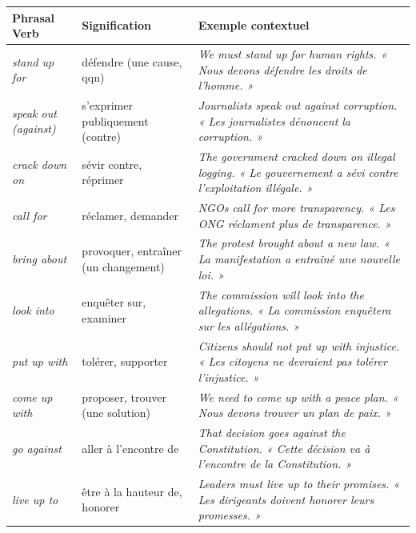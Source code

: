 \documentclass[11pt]{article}
\newcommand{\eng}[1]{\ifmmode\text{\textit{#1}}\else\begingroup\selectlanguage{english}\itshape #1\endgroup\fi}
\begin{document}
\begin{aretenir}
\begin{center}
\begin{tabularx}{\linewidth}{|X|X|X|}
\hline
\rowcolor{popblueL}
\textbf{Phrasal Verb} & \textbf{Signification} & \textbf{Exemple contextuel} \\
\hline
\eng{stand up for} & défendre (une cause, qqn) & \eng{We must stand up for human rights.} « Nous devons défendre les droits de l'homme. » \\
\hline
\eng{speak out (against)} & s'exprimer publiquement (contre) & \eng{Journalists speak out against corruption.} « Les journalistes dénoncent la corruption. » \\
\hline
\eng{crack down on} & sévir contre, réprimer & \eng{The government cracked down on illegal logging.} « Le gouvernement a sévi contre l'exploitation illégale. » \\
\hline
\eng{call for} & réclamer, demander & \eng{NGOs call for more transparency.} « Les ONG réclament plus de transparence. » \\
\hline
\eng{bring about} & provoquer, entraîner (un changement) & \eng{The protest brought about a new law.} « La manifestation a entraîné une nouvelle loi. » \\
\hline
\eng{look into} & enquêter sur, examiner & \eng{The commission will look into the allegations.} « La commission enquêtera sur les allégations. » \\
\hline
\eng{put up with} & tolérer, supporter & \eng{Citizens should not put up with injustice.} « Les citoyens ne devraient pas tolérer l'injustice. » \\
\hline
\eng{come up with} & proposer, trouver (une solution) & \eng{We need to come up with a peace plan.} « Nous devons trouver un plan de paix. » \\
\hline
\eng{go against} & aller à l'encontre de & \eng{That decision goes against the Constitution.} « Cette décision va à l'encontre de la Constitution. » \\
\hline
\eng{live up to} & être à la hauteur de, honorer & \eng{Leaders must live up to their promises.} « Les dirigeants doivent honorer leurs promesses. » \\
\hline
\end{tabularx}
\end{center}
\end{aretenir}
\end{document}
